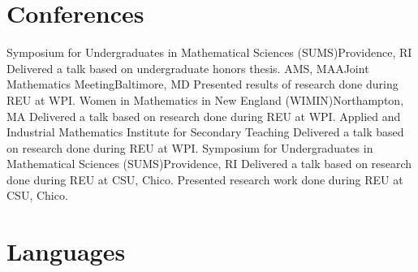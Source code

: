 \documentclass[10pt,a4paper,roman]{moderncv}        %
\begin{document}
\section{Conferences}
{Symposium for Undergraduates in Mathematical Sciences (SUMS)}{Providence, RI}
{}{Delivered a talk based on undergraduate honors thesis.}
{AMS, MAA}{Joint Mathematics Meeting}{Baltimore, MD}
{}{Presented results of research done during REU at WPI.}
{Women in Mathematics in New England (WIMIN)}{Northampton, MA}
{}{Delivered a talk based on research done during REU at WPI.}
{Applied and Industrial Mathematics Institute for Secondary Teaching}
{Delivered a talk based on research done during REU at WPI.}
{Symposium for Undergraduates in Mathematical Sciences (SUMS)}{Providence, RI}
{}{Delivered a talk based on research done during REU at CSU, Chico.}
{}{Presented research work done during REU at CSU, Chico.}

\section{Languages}
\begin{cvcolumns}
\end{cvcolumns}

\clearpage
\end{document}
